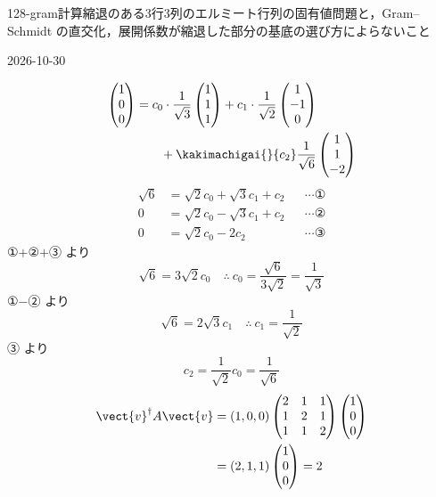 \documentclass[uplatex,dvipdfmx,a4paper,11pt]{jsarticle}
\begin{document}
\begin{mondai}{128-gram}{計算}{縮退のある3行3列のエルミート行列の固有値問題と，Gram--Schmidt の直交化，展開係数が縮退した部分の基底の選び方によらないこと}
\begin{kotaeutsushi}{2026-10-30}
\begin{align*}
\end{align*}
\begin{align*}
\begin{pmatrix}1\\0\\0\end{pmatrix}
&=c_{0}\cdot\frac{1}{\sqrt{3}}\begin{pmatrix}1\\1\\1\end{pmatrix}+c_{1}\cdot\frac{1}{\sqrt{2}}\begin{pmatrix}1\\-1\\0\end{pmatrix}\\
&\qquad+\kakimachigai{}{c_{2}}\frac{1}{\sqrt{6}}\begin{pmatrix}1\\1\\-2\end{pmatrix}
\end{align*}
\begin{align*}
\sqrt{6}&=\sqrt{2}c_{0}+\sqrt{3}c_{1}+c_{2}&&\cdots\text{①}\\
0&=\sqrt{2}c_{0}-\sqrt{3}c_{1}+c_{2}&&\cdots\text{②}\\
0&=\sqrt{2}c_{0}-2c_{2}&&\cdots\text{③}
\end{align*}
①$+$②$+$③ より
\[ \sqrt{6}=3\sqrt{2}c_{0}\quad\therefore\ c_{0}=\frac{\sqrt{6}}{3\sqrt{2}}=\frac{1}{\sqrt{3}} \]
①$-$② より
\[ \sqrt{6}=2\sqrt{3}c_{1}\quad\therefore\ c_{1}=\frac{1}{\sqrt{2}} \]
③ より
\[ c_{2}=\frac{1}{\sqrt{2}}c_{0}=\frac{1}{\sqrt{6}} \]
\begin{align*}
\vect{v}^{\dagger}A\vect{v}&=(1,0,0)\begin{pmatrix}2&1&1\\1&2&1\\1&1&2\end{pmatrix}\begin{pmatrix}1\\0\\0\end{pmatrix}\\
&=(2,1,1)\begin{pmatrix}1\\0\\0\end{pmatrix}=2

\end{align*}
\end{kotaeutsushi}
\end{mondai}
\end{document}
